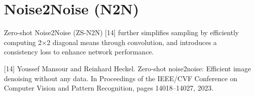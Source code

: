 \chapter{Noise2Noise (N2N)} %

Zero-shot Noise2Noise (ZS-N2N) [14]
further simplifies sampling by efficiently computing 2×2 diagonal means through convolution, and introduces a
consistency loss to enhance network performance.

[14] Youssef Mansour and Reinhard Heckel. Zero-shot noise2noise: Efficient image denoising without any data. In
Proceedings of the IEEE/CVF Conference on Computer Vision and Pattern Recognition, pages 14018–14027,
2023.